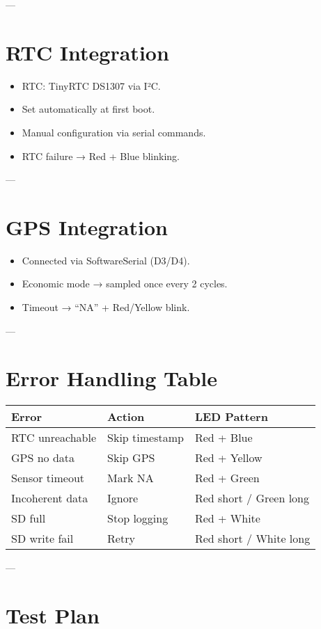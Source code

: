 \documentclass[a4paper,12pt]{article}
\begin{document}
---

\section{RTC Integration}
\begin{itemize}
  \item RTC: TinyRTC DS1307 via I²C.
  \item Set automatically at first boot.
  \item Manual configuration via serial commands.
  \item RTC failure → Red + Blue blinking.
\end{itemize}

---

\section{GPS Integration}
\begin{itemize}
  \item Connected via SoftwareSerial (D3/D4).
  \item Economic mode → sampled once every 2 cycles.
  \item Timeout → ``NA'' + Red/Yellow blink.
\end{itemize}

---

\section{Error Handling Table}

\begin{longtable}{|l|l|l|}
\hline
\textbf{Error} & \textbf{Action} & \textbf{LED Pattern} \\ \hline
RTC unreachable & Skip timestamp & Red + Blue \\ \hline
GPS no data & Skip GPS & Red + Yellow \\ \hline
Sensor timeout & Mark NA & Red + Green \\ \hline
Incoherent data & Ignore & Red short / Green long \\ \hline
SD full & Stop logging & Red + White \\ \hline
SD write fail & Retry & Red short / White long \\ \hline
\end{longtable}

---

\section{Test Plan}
\end{document}
